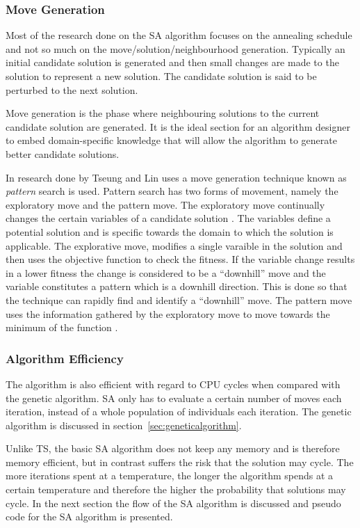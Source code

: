 \subsubsection{Move Generation}
Most of the research done on the \gls{SA} algorithm focuses on the annealing schedule and not so much on the move/solution/neighbourhood generation. Typically an initial candidate solution is generated and then small changes are made to the solution to represent a new solution. The candidate solution is said to be perturbed to the next solution.

Move generation is the phase where neighbouring solutions to the current candidate solution are generated. It is the ideal section for an algorithm designer to embed domain-specific knowledge that will allow the algorithm to generate better candidate solutions.

In research done by Tseung and Lin \cite{CurveFittingSA} uses a move generation technique known as \emph{pattern} search is used. Pattern search has two forms of movement, namely the exploratory move and the pattern move. The exploratory move continually changes the certain variables of a candidate solution \cite{CurveFittingSA}. The variables define a potential solution and is specific towards the domain to which the solution is applicable. The explorative move, modifies a single varaible in the solution and then uses the objective function to check the fitness. If the variable change results in a lower fitness the change is considered to be a ``downhill'' move and the variable constitutes a pattern which is a downhill direction. This is done so that the technique can rapidly find and identify a ``downhill'' move. The pattern move uses the information gathered by the exploratory move to move towards the minimum of the function \cite{CurveFittingSA}.
\subsubsection{Algorithm Efficiency}
The algorithm is also efficient with regard to CPU cycles when compared with the genetic algorithm. \gls{SA} only has to evaluate a certain number of moves each iteration, instead of a whole population of individuals each iteration. The genetic algorithm is discussed in section~\ref{sec:geneticalgorithm}.

Unlike \gls{TS}, the basic \gls{SA} algorithm does not keep any memory and is therefore memory efficient, but in contrast suffers the risk that the solution may cycle. The more iterations spent at a temperature, the longer the algorithm spends at a certain temperature and therefore the higher the probability that solutions may cycle. In the next section the flow of the \gls{SA} algorithm is discussed and pseudo code for the \gls{SA} algorithm is presented.

